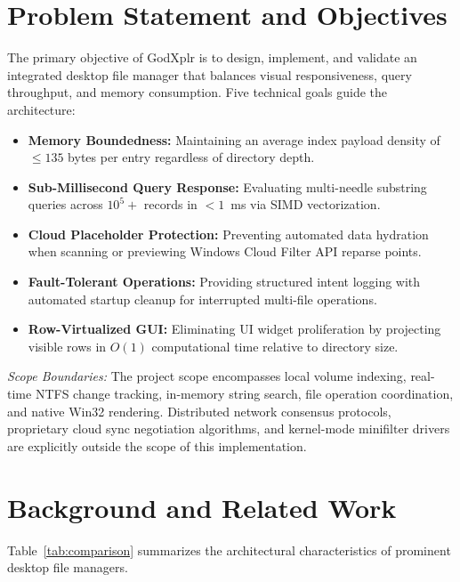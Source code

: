 \documentclass[conference]{IEEEtran}
\begin{document}
\section{Problem Statement and Objectives}
The primary objective of GodXplr is to design, implement, and validate an integrated desktop file manager that balances visual responsiveness, query throughput, and memory consumption. Five technical goals guide the architecture:
\begin{itemize}
    \item \textbf{Memory Boundedness:} Maintaining an average index payload density of $\le 135$ bytes per entry regardless of directory depth.
    \item \textbf{Sub-Millisecond Query Response:} Evaluating multi-needle substring queries across $10^5+$ records in $< 1$~ms via SIMD vectorization.
    \item \textbf{Cloud Placeholder Protection:} Preventing automated data hydration when scanning or previewing Windows Cloud Filter API reparse points.
    \item \textbf{Fault-Tolerant Operations:} Providing structured intent logging with automated startup cleanup for interrupted multi-file operations.
    \item \textbf{Row-Virtualized GUI:} Eliminating UI widget proliferation by projecting visible rows in $O(1)$ computational time relative to directory size.
\end{itemize}

\textit{Scope Boundaries:} The project scope encompasses local volume indexing, real-time NTFS change tracking, in-memory string search, file operation coordination, and native Win32 rendering. Distributed network consensus protocols, proprietary cloud sync negotiation algorithms, and kernel-mode minifilter drivers are explicitly outside the scope of this implementation.

\section{Background and Related Work}
Table~\ref{tab:comparison} summarizes the architectural characteristics of prominent desktop file managers.
\end{document}
